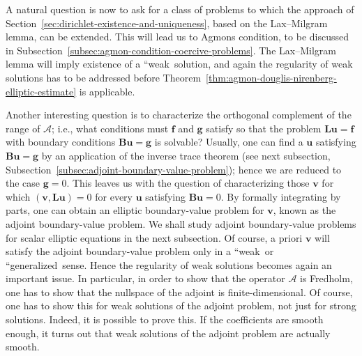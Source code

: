 A natural question is now to ask for a class of problems to which the approach of Section~\ref{sec:dirichlet-existence-and-uniqueness}, based on the Lax--Milgram lemma, can be extended. This will lead us to Agmon\textquotesingle s condition, to be discussed in Subsection~\ref{subsec:agmon-condition-coercive-problems}. The Lax--Milgram lemma will imply existence of a ``weak\textquotesingle\textquotesingle\ solution, and again the regularity of weak solutions has to be addressed before Theorem~\ref{thm:agmon-douglis-nirenberg-elliptic-estimate} is applicable.

Another interesting question is to characterize the orthogonal complement of the range of $\mathcal{A}$; i.e., what conditions must $\bm{f}$ and $\bm{g}$ satisfy so that the problem $\bm{L}\bm{u}=\bm{f}$ with boundary conditions $\bm{B}\bm{u}=\bm{g}$ is solvable? Usually, one can find a $\bm{u}$ satisfying $\bm{B}\bm{u}=\bm{g}$ by an application of the inverse trace theorem (see next subsection, Subsection~\ref{subsec:adjoint-boundary-value-problem}); hence we are reduced to the case $\bm{g}=0$. This leaves us with the question of characterizing those $\bm{v}$ for which $(\bm{v},\bm{L}\bm{u})=0$ for every $\bm{u}$ satisfying $\bm{B}\bm{u}=0$. By formally integrating by parts, one can obtain an elliptic boundary-value problem for $\bm{v}$, known as the adjoint boundary-value problem. We shall study adjoint boundary-value problems for scalar elliptic equations in the next subsection. Of course, a priori $\bm{v}$ will satisfy the adjoint boundary-value problem only in a ``weak\textquotesingle\textquotesingle\ or ``generalized\textquotesingle\textquotesingle\ sense. Hence the regularity of weak solutions becomes again an important issue. In particular, in order to show that the operator $\mathcal{A}$ is Fredholm, one has to show that the nullspace of the adjoint is finite-dimensional. Of course, one has to show this for weak solutions of the adjoint problem, not just for strong solutions. Indeed, it is possible to prove this. If the coefficients are smooth enough, it turns out that weak solutions of the adjoint problem are actually smooth.
